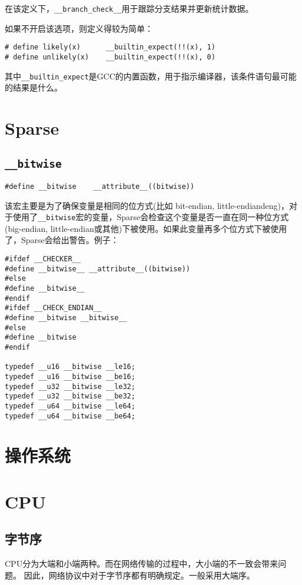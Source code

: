 		在该定义下，\texttt{__branch_check__}用于跟踪分支结果并更新统计数据。

		如果不开启该选项，则定义得较为简单：
\begin{verbatim}
# define likely(x)      __builtin_expect(!!(x), 1)
# define unlikely(x)    __builtin_expect(!!(x), 0)
\end{verbatim}
其中\texttt{__builtin_expect}是GCC的内置函数，用于指示编译器，该条件语句最可能的结果是什么。

	\section{Sparse}

		\subsection{\texttt{__bitwise}}
\begin{verbatim}
#define __bitwise    __attribute__((bitwise))     
\end{verbatim}
		
		该宏主要是为了确保变量是相同的位方式(比如 bit-endian, little-endiandeng)，对于使用了\texttt{__bitwise}宏的变量，Sparse会检查这个变量是否一直在同一种位方式(big-endian, little-endian或其他)下被使用。如果此变量再多个位方式下被使用了，Sparse会给出警告。例子：

\begin{verbatim}
#ifdef __CHECKER__
#define __bitwise__ __attribute__((bitwise))
#else
#define __bitwise__
#endif
#ifdef __CHECK_ENDIAN__
#define __bitwise __bitwise__
#else
#define __bitwise
#endif

typedef __u16 __bitwise __le16;
typedef __u16 __bitwise __be16;
typedef __u32 __bitwise __le32;
typedef __u32 __bitwise __be32;
typedef __u64 __bitwise __le64;
typedef __u64 __bitwise __be64;
\end{verbatim}
		
	\section{操作系统}
	\section{CPU}
		\subsection{字节序}
			CPU分为大端和小端两种。而在网络传输的过程中，大小端的不一致会带来问题。
因此，网络协议中对于字节序都有明确规定。一般采用大端序。

